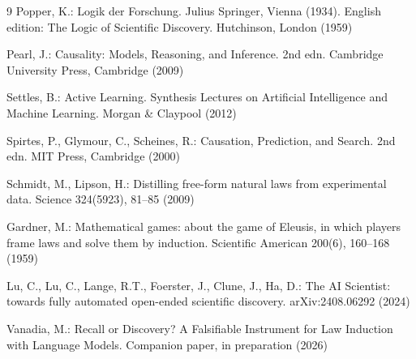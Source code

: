 \documentclass{llncs}
\begin{document}
\begin{thebibliography}{9}
Popper, K.: Logik der Forschung. Julius Springer, Vienna (1934). English
edition: The Logic of Scientific Discovery. Hutchinson, London (1959)

Pearl, J.: Causality: Models, Reasoning, and Inference. 2nd edn. Cambridge
University Press, Cambridge (2009)

Settles, B.: Active Learning. Synthesis Lectures on Artificial Intelligence
and Machine Learning. Morgan \& Claypool (2012)

Spirtes, P., Glymour, C., Scheines, R.: Causation, Prediction, and Search.
2nd edn. MIT Press, Cambridge (2000)

Schmidt, M., Lipson, H.: Distilling free-form natural laws from experimental
data. Science 324(5923), 81--85 (2009)

Gardner, M.: Mathematical games: about the game of Eleusis, in which players
frame laws and solve them by induction. Scientific American 200(6), 160--168
(1959)

Lu, C., Lu, C., Lange, R.T., Foerster, J., Clune, J., Ha, D.: The AI
Scientist: towards fully automated open-ended scientific discovery.
arXiv:2408.06292 (2024)

Vanadia, M.: Recall or Discovery? A Falsifiable Instrument for Law Induction
with Language Models. Companion paper, in preparation (2026)
\end{thebibliography}
\end{document}
